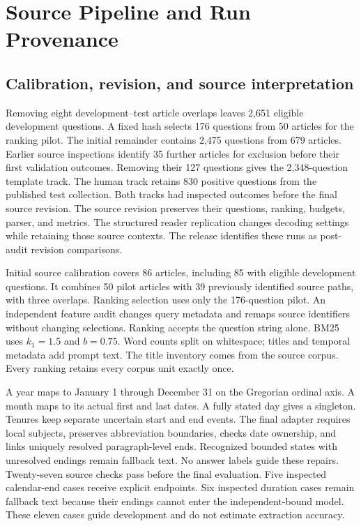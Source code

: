 \section{Source Pipeline and Run Provenance}
\label{app:pipeline}

\subsection{Calibration, revision, and source interpretation}
Removing eight development--test article overlaps leaves 2,651 eligible development questions.
A fixed hash selects 176 questions from 50 articles for the ranking pilot.
The initial remainder contains 2,475 questions from 679 articles.
Earlier source inspections identify 35 further articles for exclusion before their first validation outcomes.
Removing their 127 questions gives the 2,348-question template track.
The human track retains 830 positive questions from the published test collection.
Both tracks had inspected outcomes before the final source revision.
The source revision preserves their questions, ranking, budgets, parser, and metrics.
The structured reader replication changes decoding settings while retaining those source contexts.
The release identifies these runs as post-audit revision comparisons.

Initial source calibration covers 86 articles, including 85 with eligible development questions.
It combines 50 pilot articles with 39 previously identified source paths, with three overlaps.
Ranking selection uses only the 176-question pilot.
An independent feature audit changes query metadata and remaps source identifiers without changing selections.
Ranking accepts the question string alone.
BM25 uses $k_1=1.5$ and $b=0.75$.
Word counts split on whitespace; titles and temporal metadata add prompt text.
The title inventory comes from the source corpus.
Every ranking retains every corpus unit exactly once.

A year maps to January 1 through December 31 on the Gregorian ordinal axis.
A month maps to its actual first and last dates.
A fully stated day gives a singleton.
Tenures keep separate uncertain start and end events.
The final adapter requires local subjects, preserves abbreviation boundaries, checks date ownership, and links uniquely resolved paragraph-level ends.
Recognized bounded states with unresolved endings remain fallback text.
No answer labels guide these repairs.
Twenty-seven source checks pass before the final evaluation.
Five inspected calendar-end cases receive explicit endpoints.
Six inspected duration cases remain fallback text because their endings cannot enter the independent-bound model.
These eleven cases guide development and do not estimate extraction accuracy.


